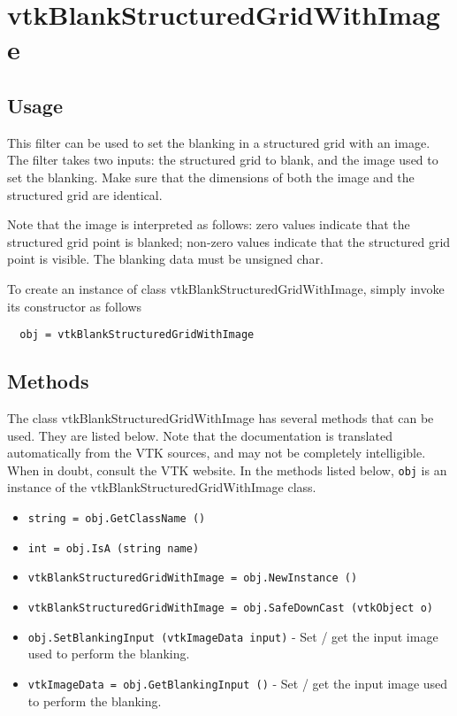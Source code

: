 \section{vtkBlankStructuredGridWithImage}

\subsection{Usage}

 This filter can be used to set the blanking in a structured grid with 
 an image. The filter takes two inputs: the structured grid to blank, 
 and the image used to set the blanking. Make sure that the dimensions of
 both the image and the structured grid are identical.

 Note that the image is interpreted as follows: zero values indicate that
 the structured grid point is blanked; non-zero values indicate that the
 structured grid point is visible. The blanking data must be unsigned char.

To create an instance of class vtkBlankStructuredGridWithImage, simply
invoke its constructor as follows
\begin{verbatim}
  obj = vtkBlankStructuredGridWithImage
\end{verbatim}
\subsection{Methods}

The class vtkBlankStructuredGridWithImage has several methods that can be used.
  They are listed below.
Note that the documentation is translated automatically from the VTK sources,
and may not be completely intelligible.  When in doubt, consult the VTK website.
In the methods listed below, \verb|obj| is an instance of the vtkBlankStructuredGridWithImage class.
\begin{itemize}
\item  \verb|string = obj.GetClassName ()|

\item  \verb|int = obj.IsA (string name)|

\item  \verb|vtkBlankStructuredGridWithImage = obj.NewInstance ()|

\item  \verb|vtkBlankStructuredGridWithImage = obj.SafeDownCast (vtkObject o)|

\item  \verb|obj.SetBlankingInput (vtkImageData input)| -  Set / get the input image used to perform the blanking.

\item  \verb|vtkImageData = obj.GetBlankingInput ()| -  Set / get the input image used to perform the blanking.

\end{itemize}
